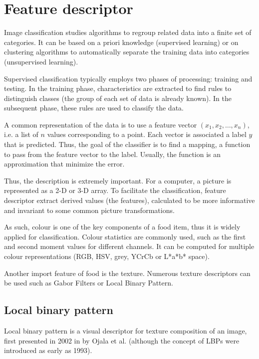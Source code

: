 \chapter{Feature descriptor} \label{sec:feature_descriptor}

Image classification studies algorithms to regroup related data into a finite set of categories. It can be based on a priori knowledge (supervised learning) or on clustering algorithms to automatically separate the training data into categories (unsupervised learning).

Supervised classification typically employs two phases of processing: training and testing. In the training phase, characteristics are extracted to find rules to distinguish classes (the group of each set of data is already known). In the subsequent phase, these rules are used to classify the data.

A common representation of the data is to use a feature vector $(x_1, x_2, \ldots, x_n)$, i.e. a list of $n$ values corresponding to a point. Each vector is associated a label $y$ that is predicted. Thus, the goal of the classifier is to find a mapping, a function to pass from the feature vector to the label. Usually, the function is an approximation that minimize the error.

Thus, the description is extremely important. For a computer, a picture is represented as a 2-D or 3-D array. To facilitate the classification, feature descriptor extract derived values (the features), calculated to be more informative and invariant to some common picture transformations.

As such, colour is one of the key components of a food item, thus it is widely applied for classification. Colour statistics are commonly used, such as the first and second moment values for different channels. It can be computed for multiple colour representations (RGB, HSV, grey, YCrCb or L*a*b* space).

Another import feature of food is the texture. Numerous texture descriptors can be used such as Gabor Filters or Local Binary Pattern.

\section{Local binary pattern}


Local binary pattern is a visual descriptor for texture composition of an image, first presented in 2002 in \cite{Ojala2002} by Ojala et al. (although the concept of LBPs were introduced as early as 1993).

